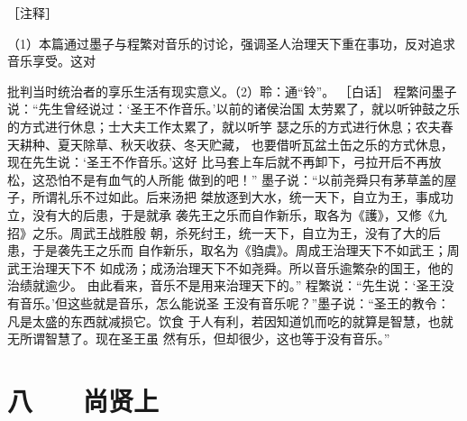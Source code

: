 \documentclass[12pt,UTF8]{ctexbook}
\begin{document}
［注释］ 

（1）本篇通过墨子与程繁对音乐的讨论，强调圣人治理天下重在事功，反对追求音乐享受。这对 

批判当时统治者的享乐生活有现实意义。（2）聆：通“铃”。 
［白话］ 
程繁问墨子说：“先生曾经说过：‘圣王不作音乐。’以前的诸侯治国 
太劳累了，就以听钟鼓之乐的方式进行休息；士大夫工作太累了，就以听竽 
瑟之乐的方式进行休息；农夫春天耕种、夏天除草、秋天收获、冬天贮藏， 
也要借听瓦盆土缶之乐的方式休息，现在先生说：‘圣王不作音乐。’这好 
比马套上车后就不再卸下，弓拉开后不再放松，这恐怕不是有血气的人所能 
做到的吧！” 
墨子说：“以前尧舜只有茅草盖的屋子，所谓礼乐不过如此。后来汤把 
桀放逐到大水，统一天下，自立为王，事成功立，没有大的后患，于是就承 
袭先王之乐而自作新乐，取各为《護》，又修《九招》之乐。周武王战胜殷 
朝，杀死纣王，统一天下，自立为王，没有了大的后患，于是袭先王之乐而 
自作新乐，取名为《驺虞》。周成王治理天下不如武王；周武王治理天下不 
如成汤；成汤治理天下不如尧舜。所以音乐逾繁杂的国王，他的治绩就逾少。 
由此看来，音乐不是用来治理天下的。” 
程繁说：“先生说：‘圣王没有音乐。’但这些就是音乐，怎么能说圣 
王没有音乐呢？”墨子说：“圣王的教令：凡是太盛的东西就减损它。饮食 
于人有利，若因知道饥而吃的就算是智慧，也就无所谓智慧了。现在圣王虽 
然有乐，但却很少，这也等于没有音乐。” 

\chapter{八　　尚贤上}
\end{document}
